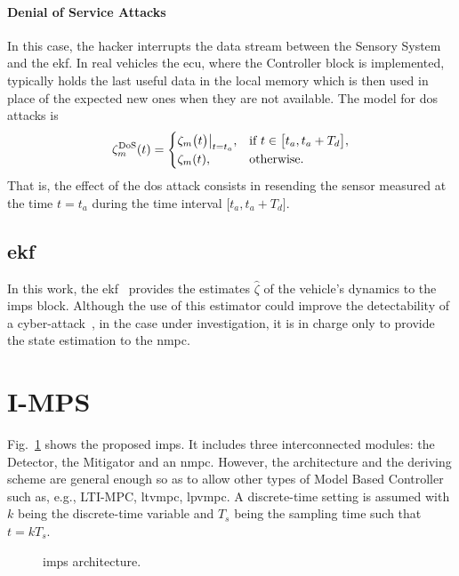 \paragraph{Denial of Service Attacks}
In this case, the hacker interrupts the data stream between the Sensory System and the \gls{ekf}. In real vehicles the \gls{ecu}, where the Controller block is implemented, typically holds the last useful data in the local memory which is then used in place of the expected new ones when they are not available. The model for \gls{dos} attacks is~\cite{schenato2009zero}
%
\begin{equation}
	\label{eq:Dos_model}
	\zeta^{\rm DoS}_{m}(t)=%
	\begin{cases}
		\zeta_m\big(t\big)\big|_{t=t_a}, & \mbox{if } t \in \big[t_a,t_a+T_d\big], \\ \zeta_m(t), & \mbox{otherwise}.
	\end{cases}
\end{equation} 
%
That is, the effect of the \gls{dos} attack consists in resending the sensor measured at the time $t=t_a$ during the time interval $\big[t_a,t_a+T_d\big]$.
\subsection{\gls{ekf}}
\label{subsec:Estimator}
%
In this work, the \gls{ekf}~\cite{EKF_3} provides the estimates $\hat\zeta$ of the vehicle's dynamics to the \gls{imps} block. Although the use of this estimator could improve the detectability of a cyber-attack~\cite{ekf_1_attack}, in the case under investigation, it is in charge only to provide the state estimation to the \gls{nmpc}.






\section{I-MPS}
\label{sec:I-MPS}
%
Fig.~\ref{fig:I-NMPC} shows the proposed \gls{imps}. It includes three interconnected modules: the Detector, the Mitigator and an \gls{nmpc}. However, the architecture and the deriving scheme are general enough so as to allow other types of Model Based Controller such as, e.g., LTI-MPC, \gls{ltvmpc}, \gls{lpvmpc}. A discrete-time setting is assumed with $k$ being the discrete-time variable and $T_s$ being the sampling time such that $t=kT_s$.
%
\begin{figure}[H]
	\centering
	
	\caption{\gls{imps} architecture.}
	\label{fig:I-NMPC}
\end{figure}
%
